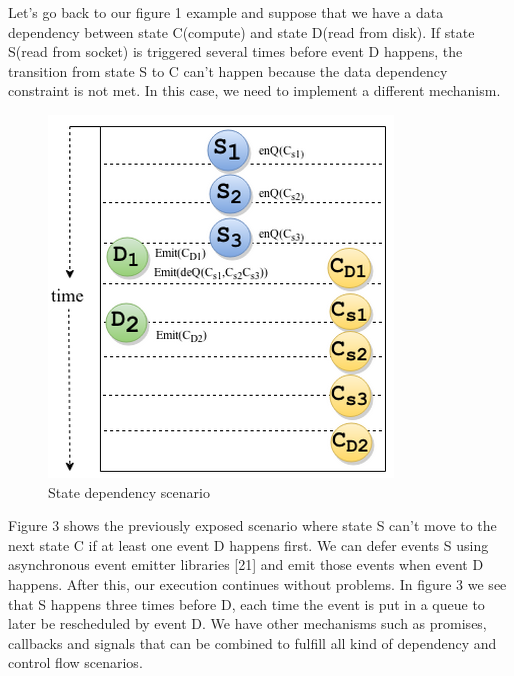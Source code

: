 \documentclass[10pt,reprint]{socc14}
\begin{document}
Let’s go back to our figure 1 example and suppose that we have a data dependency between state C(compute) and state D(read from disk). If state S(read from socket) is triggered several times before event D happens, the transition from state S to C can’t happen because the data dependency constraint is not met. In this case, we need to implement a different mechanism. 

\begin{figure}[h]	
	\centering
	\includegraphics[scale=0.6]{StateDependency}
	\caption{State dependency scenario}
\end{figure}


Figure 3 shows the previously exposed scenario where state S can’t move to the next state C if at least one event D happens first.  We can defer events S using asynchronous event emitter libraries [21] and emit those events when event D happens. After this, our execution continues without problems. In figure 3 we see that S happens three times before D, each time the event is put in a queue to later be rescheduled by event D. We have other mechanisms such as promises, callbacks and signals that can be combined to fulfill all kind of dependency and control flow scenarios.

\end{document}

